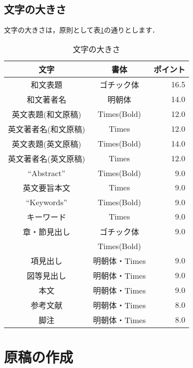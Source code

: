 \documentclass{hisken}
\begin{document}
\subsection{文字の大きさ}
文字の大きさは，原則として表\ref{table:charsize}の通りとします．

\begin{table}[tbh]
	\begin{center}
	\caption{文字の大きさ}		%
	\label{table:charsize}
	\begin{tabular}[hbt]{c c r}
	\hline
	\bf 文字 & \bf 書体 & \bf ポイント\\
	\hline
	和文表題 & ゴチック体 & 16.5\\
	和文著者名 & 明朝体 & 14.0\\
	英文表題(和文原稿) & Times(Bold) & 12.0\\
	英文著者名(和文原稿) & Times & 12.0\\
	英文表題(英文原稿) & Times(Bold) & 14.0\\
	英文著者名(英文原稿) & Times & 12.0\\
	``Abstract'' & Times(Bold) & 9.0\\
	英文要旨本文 & Times & 9.0\\
	``Keywords'' & Times(Bold) & 9.0 \\
	キーワード & Times & 9.0\\ \vspace{-0.7mm}
	章・節見出し & ゴチック体 & 9.0\\
	& Times(Bold) & \\
	項見出し & 明朝体・Times & 9.0\\
	図等見出し & 明朝体・Times & 9.0\\
	本文 & 明朝体・Times & 9.0\\
	参考文献 & 明朝体・Times & 8.0\\ \vspace{-0.7mm}
	脚注 & 明朝体・Times &  8.0\\
	\hline
	\end{tabular}
	\end{center}
\end{table}



\section{原稿の作成}
\end{document}
